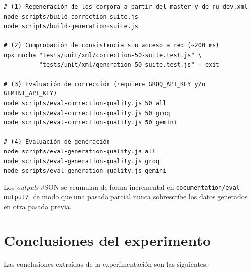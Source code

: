 \begin{verbatim}
# (1) Regeneración de los corpora a partir del master y de ru_dev.xml
node scripts/build-correction-suite.js
node scripts/build-generation-suite.js

# (2) Comprobación de consistencia sin acceso a red (~200 ms)
npx mocha "tests/unit/xml/correction-50-suite.test.js" \
          "tests/unit/xml/generation-50-suite.test.js" --exit

# (3) Evaluación de corrección (requiere GROQ_API_KEY y/o GEMINI_API_KEY)
node scripts/eval-correction-quality.js 50 all
node scripts/eval-correction-quality.js 50 groq
node scripts/eval-correction-quality.js 50 gemini

# (4) Evaluación de generación
node scripts/eval-generation-quality.js all
node scripts/eval-generation-quality.js groq
node scripts/eval-generation-quality.js gemini
\end{verbatim}

Los \textit{outputs} JSON se acumulan de forma incremental en
\texttt{documentation/eval-output/}, de modo que una pasada parcial nunca
sobrescribe los datos generados en otra pasada previa.

\section{Conclusiones del experimento}

Las conclusiones extraídas de la experimentación son las siguientes:

